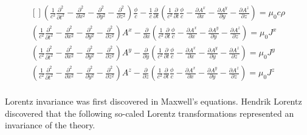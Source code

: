 \documentclass[a4]{article}
\begin{document}
    \begin{framed}
        \begin{equation}
            \begin{aligned}[]
                (\frac{1}{c^2} \frac{\partial^2}{\partial t^2} - \frac{\partial^2}{\partial x^2} - \frac{\partial^2}{\partial y^2} - \frac{\partial^2}{\partial z^2}) \frac{\phi}{c} - \frac{1}{c} \frac{\partial}{\partial t} (\frac{1}{c^2} \frac{\partial}{\partial t} \frac{\phi}{c} - \frac{\partial A^x}{\partial x} - \frac{\partial A^y}{\partial y} - \frac{\partial A^z}{\partial z}) = \mu_0 c \rho \\
                (\frac{1}{c^2} \frac{\partial^2}{\partial t^2} - \frac{\partial^2}{\partial x^2} - \frac{\partial^2}{\partial y^2} - \frac{\partial^2}{\partial z^2}) A^x - \frac{\partial}{\partial x} (\frac{1}{c^2} \frac{\partial}{\partial t} \frac{\phi}{c} - \frac{\partial A^x}{\partial x} - \frac{\partial A^y}{\partial y} - \frac{\partial A^z}{\partial z}) = \mu_0 J^x \\
                (\frac{1}{c^2} \frac{\partial^2}{\partial t^2} - \frac{\partial^2}{\partial x^2} - \frac{\partial^2}{\partial y^2} - \frac{\partial^2}{\partial z^2}) A^y - \frac{\partial}{\partial y} (\frac{1}{c^2} \frac{\partial}{\partial t} \frac{\phi}{c} - \frac{\partial A^x}{\partial x} - \frac{\partial A^y}{\partial y} - \frac{\partial A^z}{\partial z}) = \mu_0 J^y \\
                (\frac{1}{c^2} \frac{\partial^2}{\partial t^2} - \frac{\partial^2}{\partial x^2} - \frac{\partial^2}{\partial y^2} - \frac{\partial^2}{\partial z^2}) A^z - \frac{\partial}{\partial z} (\frac{1}{c^2} \frac{\partial}{\partial t} \frac{\phi}{c} - \frac{\partial A^x}{\partial x} - \frac{\partial A^y}{\partial y} - \frac{\partial A^z}{\partial z}) = \mu_0 J^z \\
            \end{aligned}
        \end{equation}
    \end{framed}

    Lorentz invariance was first discovered in Maxwell's equations. Hendrik Lorentz discovered that the following so-caled Lorentz transformations represented an invariance of the theory.
\end{document}
